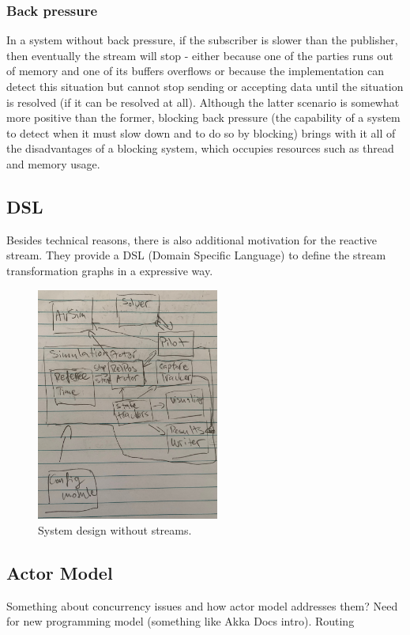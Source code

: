 \documentclass{article}
\begin{document}
\subsubsection{Back pressure}
In a system without back pressure, if the subscriber is slower than the publisher, then eventually the stream will stop - either because one of the parties runs out of memory and one of its buffers overflows or because the implementation can detect this situation but cannot  stop sending or accepting data until the situation is resolved (if it can be resolved at all). Although the latter scenario is somewhat more positive than the former, blocking back pressure (the capability of a system to detect when it must slow down and to do so by blocking) brings with it all of the disadvantages of a blocking system, which occupies resources such as thread and memory usage. \cite{reactive-web-apps}

\subsection{DSL}
Besides technical reasons, there is also additional motivation for the reactive stream. They provide a DSL (Domain Specific Language) \cite{dsl-book} to define the stream transformation graphs in a expressive way. 

\begin{figure}
	\centering
	\includegraphics[width=6.0cm]{before-flow}
	\caption{System design without streams.}\label{fig:before-stream}
\end{figure}


\subsection{Actor Model}
Something about concurrency issues and how actor model addresses them?
Need for new programming model (something like Akka Docs intro).
Routing
\end{document}

